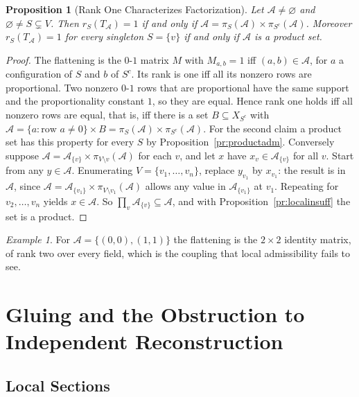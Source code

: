 \documentclass[11pt,letterpaper]{report}
\theoremstyle{plain}
\newtheorem{proposition}[theorem]{Proposition}
\theoremstyle{definition}
\theoremstyle{remark}
\newtheorem{example}[theorem]{Example}
\begin{document}
\begin{proposition}[Rank One Characterizes Factorization]\label{pr:rankone}
Let $\mathcal A\ne\varnothing$ and $\varnothing\ne S\subsetneq V$. Then $r_S(T_{\mathcal A})=1$ if and only if $\mathcal A=\pi_S(\mathcal A)\times\pi_{S^c}(\mathcal A)$. Moreover $r_S(T_{\mathcal A})=1$ for every singleton $S=\{v\}$ if and only if $\mathcal A$ is a product set.
\end{proposition}
\begin{proof}
The flattening is the $0$-$1$ matrix $M$ with $M_{a,b}=1$ iff $(a,b)\in\mathcal A$, for $a$ a configuration of $S$ and $b$ of $S^c$. Its rank is one iff all its nonzero rows are proportional. Two nonzero $0$-$1$ rows that are proportional have the same support and the proportionality constant $1$, so they are equal. Hence rank one holds iff all nonzero rows are equal, that is, iff there is a set $B\subseteq X_{S^c}$ with $\mathcal A=\{a:\text{row }a\ne0\}\times B=\pi_S(\mathcal A)\times\pi_{S^c}(\mathcal A)$. For the second claim a product set has this property for every $S$ by Proposition~\ref{pr:productadm}. Conversely suppose $\mathcal A=\mathcal A_{\{v\}}\times\pi_{V\setminus v}(\mathcal A)$ for each $v$, and let $x$ have $x_v\in\mathcal A_{\{v\}}$ for all $v$. Start from any $y\in\mathcal A$. Enumerating $V=\{v_1,\dots,v_n\}$, replace $y_{v_1}$ by $x_{v_1}$: the result is in $\mathcal A$, since $\mathcal A=\mathcal A_{\{v_1\}}\times\pi_{V\setminus v_1}(\mathcal A)$ allows any value in $\mathcal A_{\{v_1\}}$ at $v_1$. Repeating for $v_2,\dots,v_n$ yields $x\in\mathcal A$. So $\prod_v\mathcal A_{\{v\}}\subseteq\mathcal A$, and with Proposition~\ref{pr:localinsuff} the set is a product.
\end{proof}

\begin{example}
For $\mathcal A=\{(0,0),(1,1)\}$ the flattening is the $2\times2$ identity matrix, of rank two over every field, which is the coupling that local admissibility fails to see.
\end{example}

\chapter{Gluing and the Obstruction to Independent Reconstruction}

\section{Local Sections}
\end{document}
